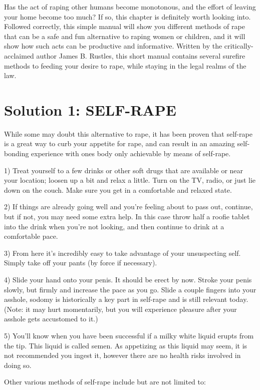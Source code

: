  
Has the act of raping other humans become monotonous, and the effort of leaving 
your home become too much? If so, this chapter is definitely worth looking into. 
Followed correctly, this simple manual will show you different methods of rape 
that can be a safe and fun alternative to raping women or children, and it will 
show how such acts can be productive and informative. Written by the 
critically-acclaimed author James B. Rustles, this short manual contains several 
surefire methods to feeding your desire to rape, while staying in the legal 
realms of the law.


\section*{Solution 1: SELF-RAPE}

While some may doubt this alternative to rape, it has been proven that self-rape 
is a great way to curb your appetite for rape, and can result in an amazing 
self-bonding experience with ones body only achievable by means of self-rape.

1) Treat yourself to a few drinks or other soft drugs that are available or near 
your location; loosen up a bit and relax a little. Turn on the TV, radio, or 
just lie down on the couch. Make sure you get in a comfortable and relaxed 
state.

2) If things are already going well and you’re feeling about to pass out, 
continue, but if not, you may need some extra help. In this case throw half a 
roofie tablet into the drink when you’re not looking, and then continue to drink 
at a comfortable pace.

3) From here it's incredibly easy to take advantage of your unsuspecting self. 
Simply take off your pants (by force if necessary).

4) Slide your hand onto your penis. It should be erect by now. Stroke your penis 
slowly, but firmly and increase the pace as you go. Slide a couple fingers into 
your asshole, sodomy is historically a key part in self-rape and is still 
relevant today. (Note: it may hurt momentarily, but you will experience pleasure 
after your asshole gets accustomed to it.)

5) You’ll know when you have been successful if a milky white liquid erupts from 
the tip. This liquid is called semen. As appetizing as this liquid may seem, it 
is not recommended you ingest it, however there are no health risks involved in 
doing so.


Other various methods of self-rape include but are not limited to:


